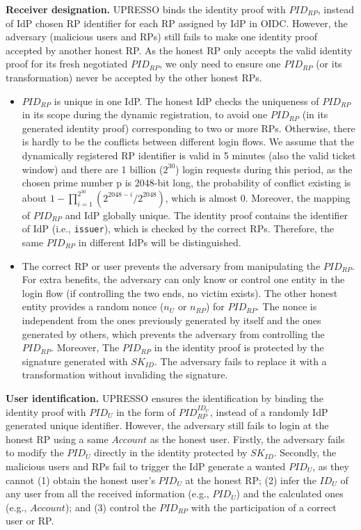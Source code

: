 \vspace{1mm}\noindent\textbf{Receiver designation.} UPRESSO binds the identity proof with $PID_{RP}$, instead of IdP chosen RP identifier for each RP assigned by IdP in OIDC. However, the adversary (malicious users and RPs) still fails to  make one identity proof
accepted by another honest RP. As the honest RP only accepts the valid identity proof for its fresh negotiated $PID_{RP}$, we only need to ensure one $PID_{RP}$ (or its transformation) never be accepted by the other honest RPs.
\begin{itemize}
\item $PID_{RP}$ is unique in one IdP. The honest IdP checks the uniqueness of $PID_{RP}$ in its scope during the dynamic registration, to avoid one $PID_{RP}$ (in its generated identity proof) corresponding to two or more RPs. Otherwise, there is hardly to be the conflicts between different login flows. We assume that the dynamically registered RP identifier is valid in 5 minutes (also the valid ticket window) and there are 1 billion ($2^{30}$) login requests during this period, as the chosen prime number p is 2048-bit long, the probability of conflict existing is about $1-\prod_{i=1}^{2^{30}}(2^{2048-i}/2^{2048})$, which is almost 0. Moreover, the mapping of $PID_{RP}$ and IdP globally unique. The identity proof contains the identifier of IdP (i.e., \verb+issuer+), which is checked by the correct RPs. Therefore, the same $PID_{RP}$ in different IdPs will be distinguished.

\item The correct RP or user prevents the adversary from manipulating the $PID_{RP}$. For extra benefits, the adversary can only know or control one entity in the login flow (if controlling the two ends, no victim exists). The other honest entity provides a random nonce ($n_U$ or $n_{RP}$) for $PID_{RP}$. The nonce is independent from the ones previously generated by itself  and the ones generated by others, which prevents the adversary from controlling the $PID_{RP}$. Moreover, The $PID_{RP}$ in the identity proof is protected by the signature generated with $SK_{ID}$. The adversary fails to replace it with a transformation without invaliding the signature.

\end{itemize}

\vspace{1mm}\noindent\textbf{User identification.} UPRESSO ensures the identification by binding the identity proof with $PID_U$  in the form of $PID_{RP}^{ID_U}$, instead of a randomly IdP generated unique identifier. However, the adversary still fails to login at the honest RP using a same $Account$ as the honest user. Firstly, the adversary fails to  modify the $PID_U$ directly in the identity protected by $SK_{ID}$. Secondly, the malicious users and RPs fail to trigger the IdP generate a wanted $PID_U$, as they cannot (1) obtain the honest user's $PID_U$ at the honest RP; (2) infer the $ID_U$ of any user from all the received  information (e.g., $PID_U$) and the calculated ones (e.g., $Account$); and (3) control the $PID_{RP}$ with the participation of a correct user or RP.

